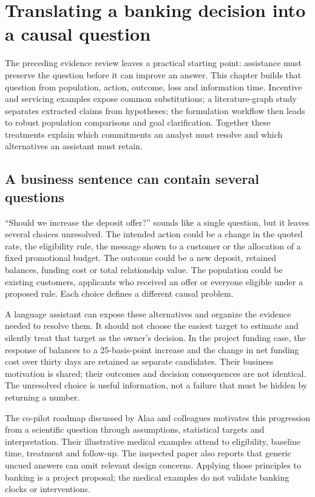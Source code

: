 \chapter{Translating a banking decision into a causal question}
\label{la:translation}

The preceding evidence review leaves a practical starting point: assistance
must preserve the question before it can improve an answer. This chapter
builds that question from population, action, outcome, loss and information
time. Incentive and servicing examples expose common substitutions; a
literature-graph study separates extracted claims from hypotheses; the
formulation workflow then leads to robust population comparisons and goal
clarification. Together these treatments explain which commitments an analyst
must resolve and which alternatives an assistant must retain.

\section{A business sentence can contain several questions}

``Should we increase the deposit offer?'' sounds like a single question, but
it leaves several choices unresolved. The intended action could be a change
in the quoted rate, the eligibility rule, the message shown to a customer or
the allocation of a fixed promotional budget. The outcome could be a new
deposit, retained balances, funding cost or total relationship value. The
population could be existing customers, applicants who received an offer or
everyone eligible under a proposed rule. Each choice defines a different
causal problem.

A language assistant can expose these alternatives and organize the evidence
needed to resolve them. It should not choose the easiest target to estimate
and silently treat that target as the owner's decision. In the project funding
case, the response of balances to a 25-basis-point increase and the change in
net funding cost over thirty days are retained as separate candidates. Their
business motivation is shared; their outcomes and decision consequences are
not identical. The unresolved choice is useful information, not a failure
that must be hidden by returning a number.

The co-pilot roadmap discussed by Alaa and colleagues motivates this progression
from a scientific question through assumptions, statistical targets and
interpretation. Their illustrative medical examples attend to eligibility,
baseline time, treatment and follow-up. The inspected paper also reports that
generic uncued answers can omit relevant design concerns. Applying those
principles to banking is a project proposal; the medical examples do not
validate banking clocks or interventions. \cite{v12_la_2407_19118}

